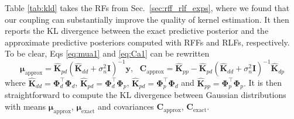 Table \ref{tab:kld} takes the RFs from Sec.~\ref{sec:rff_rlf_exps}, where we found that our coupling can substantially improve the quality of kernel estimation. 
It then reports the KL divergence between the exact predictive posterior and the approximate predictive posteriors computed with RFFs and RLFs, respectively.
To be clear, Eqs \ref{eq:mua1} and \ref{eq:Ca1} can be rewritten
\begin{equation} \label{eq:approx_muandc}
    \boldsymbol{\mu}_{\text{approx}} = \widehat{\mathbf{K}}_{pd} (\widehat{\mathbf{K}}_{dd} + \sigma_n^2 \boldsymbol{I})^{-1}\boldsymbol{y},
    ~~~\mathbf{C}_{\text{approx}} = \widehat{\mathbf{K}}_{pp} - \widehat{\mathbf{K}}_{pd} (\widehat{\mathbf{K}}_{dd} + \sigma_n^2 \mathbf{I})^{-1}\widehat{\mathbf{K}}_{dp}
\end{equation}
where $\widehat{\mathbf{K}}_{dd} = {\mathbf{\Phi}}_d^\top {\mathbf{\Phi}}_d$, 
$\widehat{\mathbf{K}}_{pd} = {\mathbf{\Phi}}_d^\top {\mathbf{\Phi}}_p$,
$\widehat{\mathbf{K}}_{pd} = {\mathbf{\Phi}}_p^\top {\mathbf{\Phi}}_d$ and $\widehat{\mathbf{K}}_{pp} = {\boldsymbol{\Phi}}_p^\top {\boldsymbol{\Phi}}_p.$
It is then straightforward to compute the KL divergence between Gaussian distributions with means $ \boldsymbol{\mu}_{\text{approx}}$, $ \boldsymbol{\mu}_{\text{exact}}$ and covariances $\mathbf{C}_{\text{approx}}$, $\mathbf{C}_{\text{exact}}$.

